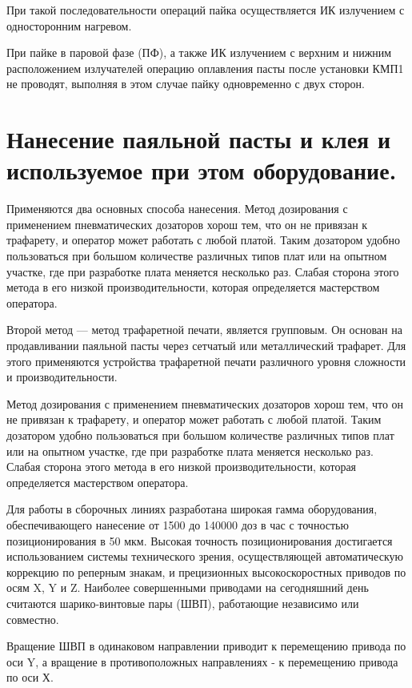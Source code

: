 \documentclass[unicode, 12pt, a4paper, oneside]{article}
\begin{document}
При такой последовательности операций пайка осуществляется ИК излучением с односторонним нагревом.

При пайке в паровой фазе (ПФ), а также ИК излучением с верхним и нижним расположением излучателей операцию оплавления пасты после установки КМП1 не проводят, выполняя в этом случае пайку одновременно с двух сторон.


\section{Нанесение паяльной пасты и клея и используемое при этом оборудование.}

Применяются два основных способа нанесения. Метод дозирования с применением пневматических дозаторов хорош тем, что он не привязан к трафарету, и оператор может работать с любой платой. Таким дозатором удобно пользоваться при большом количестве различных типов плат или на опытном участке, где при разработке плата меняется несколько раз. Слабая сторона этого метода в его низкой производительности, которая определяется мастерством оператора.

Второй метод — метод трафаретной печати, является групповым. Он основан на продавливании паяльной пасты  через сетчатый или металлический трафарет. Для этого применяются устройства трафаретной печати различного уровня сложности и производительности.

Метод дозирования с применением пневматических дозаторов хорош тем, что он не привязан к трафарету, и оператор может работать с любой платой. Таким дозатором удобно пользоваться при большом количестве различных типов плат или на опытном участке, где при разработке плата меняется несколько раз. Слабая сторона этого метода в его низкой производительности, которая определяется мастерством оператора.

Для работы в сборочных линиях  разработана широкая гамма оборудования, обеспечивающего нанесение от 1500 до 140000 доз в час с точностью позиционирования в 50 мкм. Высокая точность позиционирования достигается использованием системы технического зрения, осуществляющей автоматическую коррекцию по реперным знакам, и прецизионных высокоскоростных приводов по осям X, Y и Z. Наиболее совершенными приводами на сегодняшний день считаются шарико-винтовые пары (ШВП), работающие независимо или совместно.

Вращение ШВП в одинаковом направлении приводит к перемещению привода по оси Y, а вращение в противоположных направлениях  - к перемещению привода по оси Х.
\end{document}
